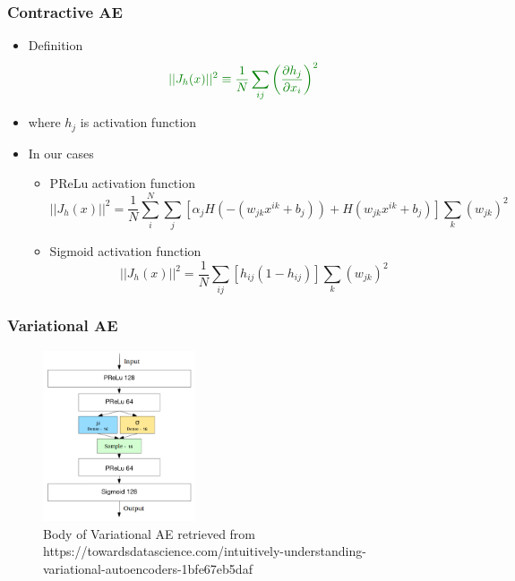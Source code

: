 \subsubsection{Contractive AE}
\begin{itemize}
    \item Definition
    \begin{equation}
        \textcolor[RGB]{0,128,0}{||J_h(x)||^2 \equiv \frac{1}{N}\sum_{ij}\left(\frac{\partial h_j}{\partial x_i}\right)^2}
    \end{equation}
    \item where $h_j$ is activation function
    \item In our cases
    \begin{itemize}
        \item PReLu activation function
        \begin{equation}
            ||J_h(x)||^2 = \frac{1}{N}\sum_i^N\sum_j[\alpha_j H(-(w_{jk}x^{ik}+b_j)) + H(w_{jk}x^{ik}+b_j)]\sum_k(w_{jk})^2
        \end{equation}
        \item Sigmoid activation function
        \begin{equation}
            ||J_h(x)||^2 = \frac{1}{N}\sum_{ij}[h_{ij}(1-h_{ij})]\sum_k(w_{jk})^2
        \end{equation}
    \end{itemize}
\end{itemize}

\subsubsection{Variational AE}
\begin{figure}[h!]
    \centering
    \includegraphics[width=0.4\textwidth]{images/variational_ae.png}
    \caption{Body of Variational AE retrieved from https://towardsdatascience.com/intuitively-understanding-variational-autoencoders-1bfe67eb5daf}
    \label{fig:variational_ae}
\end{figure}


